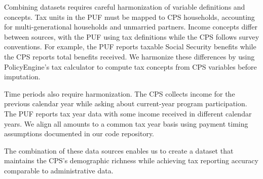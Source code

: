 Combining datasets requires careful harmonization of variable definitions and concepts. Tax units in the PUF must be mapped to CPS households, accounting for multi-generational households and unmarried partners. Income concepts differ between sources, with the PUF using tax definitions while the CPS follows survey conventions. For example, the PUF reports taxable Social Security benefits while the CPS reports total benefits received. We harmonize these differences by using PolicyEngine's tax calculator to compute tax concepts from CPS variables before imputation.

Time periods also require harmonization. The CPS collects income for the previous calendar year while asking about current-year program participation. The PUF reports tax year data with some income received in different calendar years. We align all amounts to a common tax year basis using payment timing assumptions documented in our code repository.

The combination of these data sources enables us to create a dataset that maintains the CPS's demographic richness while achieving tax reporting accuracy comparable to administrative data.